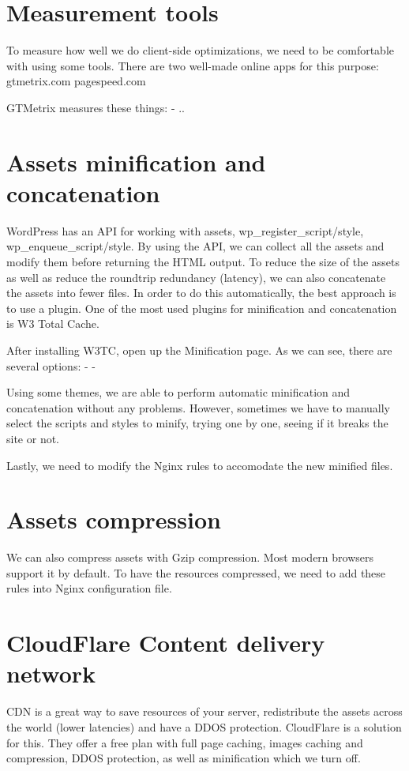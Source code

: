 \section{Measurement tools}

To measure how well we do client-side optimizations, we need to be comfortable with using some tools. There are two well-made online apps for this purpose:
gtmetrix.com
pagespeed.com

GTMetrix measures these things:
- ..

\section{Assets minification and concatenation}

WordPress has an API for working with assets, wp\_register\_script/style, wp\_enqueue\_script/style. By using the API, we can collect all the assets and modify them before returning the HTML output. To reduce the size of the assets as well as reduce the roundtrip redundancy (latency), we can also concatenate the assets into fewer files. In order to do this automatically, the best approach is to use a plugin. One of the most used plugins for minification and concatenation is W3 Total Cache.

After installing W3TC, open up the Minification page. As we can see, there are several options:
-
-

Using some themes, we are able to perform automatic minification and concatenation without any problems. However, sometimes we have to manually select the scripts and styles to minify, trying one by one, seeing if it breaks the site or not.

Lastly, we need to modify the Nginx rules to accomodate the new minified files.

\section{Assets compression}

We can also compress assets with Gzip compression. Most modern browsers support it by default. To have the resources compressed, we need to add these rules into Nginx configuration file.

\section{CloudFlare Content delivery network}

CDN is a great way to save resources of your server, redistribute the assets across the world (lower latencies) and have a DDOS protection. CloudFlare is a solution for this. They offer a free plan with full page caching, images caching and compression, DDOS protection, as well as minification which we turn off.

